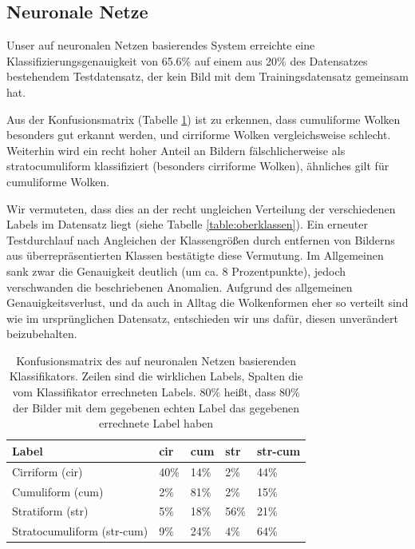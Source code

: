 \documentclass[a4,german]{article}
\begin{document}
\subsection{Neuronale Netze}

Unser auf neuronalen Netzen basierendes System erreichte eine Klassifizierungsgenauigkeit von 65.6\% auf einem aus 20\% des Datensatzes bestehendem Testdatensatz, der kein Bild mit dem Trainingsdatensatz gemeinsam hat.

Aus der Konfusionsmatrix (Tabelle \ref{tab:confusionNeural}) ist zu erkennen, dass cumuliforme Wolken besonders gut erkannt werden, und cirriforme Wolken vergleichsweise schlecht.
Weiterhin wird ein recht hoher Anteil an Bildern fälschlicherweise als stratocumuliform klassifiziert (besonders cirriforme Wolken), ähnliches gilt für cumuliforme Wolken.

Wir vermuteten, dass dies an der recht ungleichen Verteilung der verschiedenen Labels im Datensatz liegt (siehe Tabelle \ref{table:oberklassen}).
Ein erneuter Testdurchlauf nach Angleichen der Klassengrößen durch entfernen von Bilderns aus überrepräsentierten Klassen bestätigte diese Vermutung.
Im Allgemeinen sank zwar die Genauigkeit deutlich (um ca. 8 Prozentpunkte), jedoch verschwanden die beschriebenen Anomalien.
Aufgrund des allgemeinen Genauigkeitsverlust, und da auch in Alltag die Wolkenformen eher so verteilt sind wie im ursprünglichen Datensatz, entschieden wir uns dafür, diesen unverändert beizubehalten.


\begin{table}
    \begin{tabular}{| l | l | l | l | l |}
        \hline
        Label & cir & cum & str & str-cum \\ \hline
        Cirriform (cir) & 40\% & 14\% & 2\% & 44\% \\ \hline
        Cumuliform (cum) & 2\% & 81\% & 2\% & 15\% \\ \hline
        Stratiform (str) & 5\% & 18\% & 56\% & 21\% \\ \hline
        Stratocumuliform (str-cum) & 9\% & 24\% & 4\% & 64\% \\ \hline
    \end{tabular}
    \caption{Konfusionsmatrix des auf neuronalen Netzen basierenden Klassifikators. Zeilen sind die wirklichen Labels, Spalten die vom Klassifikator errechneten Labels. 80\% heißt, dass 80\% der Bilder mit dem gegebenen echten Label das gegebenen errechnete Label haben}
    \label{tab:confusionNeural}
\end{table}
\end{document}
